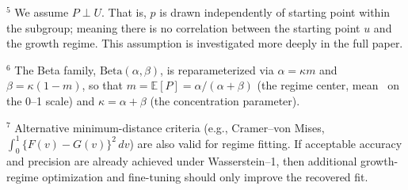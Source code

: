 \documentclass[10pt]{article}
\begin{document}
\begin{minipage}[t]{7.55in}
{\vspace{4pt}
$^{5}$ We assume $P\perp U$. That is, $p$ is drawn independently of starting
point within the subgroup; meaning there is no correlation between the starting point $u$ and
the growth regime. This assumption is investigated more deeply in the full paper.

\vspace{4pt}
$^{6}$ The Beta family, $\mathrm{Beta}(\alpha, \beta)$, is reparameterized via
$\alpha = \kappa m$ and $\beta = \kappa(1-m)$, so that $m = \mathbb{E}[P] = \alpha / (\alpha + \beta)$
(the regime center, mean \SGPc~on the 0--1 scale) and $\kappa = \alpha + \beta$
(the concentration parameter).

\vspace{4pt}
$^{7}$ Alternative minimum-distance criteria (e.g., Cramer--von Mises,
$\int_0^1 \{F(v)-G(v)\}^2\,dv$) are also valid for regime fitting. If acceptable
accuracy and precision are already achieved under Wasserstein--1, then additional
growth-regime optimization and fine-tuning should only improve the recovered fit.}
\end{minipage}
\end{document}
